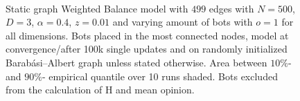 \documentclass[11pt]{article}
\begin{document}
\begin{figure}[!htb]
\begin{center}
\\[-2.3ex]


\end{center}
\caption{Static graph Weighted Balance model with $499$ edges with $N=500$, $D=3$, $\alpha=0.4$, $z=0.01$ and varying amount of bots with $o=1$ for all dimensions. Bots placed in the most connected nodes, model at convergence/after 100k single updates and on randomly initialized Barabási–Albert graph unless stated otherwise. Area between $10\%$- and $90\%$- empirical quantile over 10 runs shaded. Bots excluded from the calculation of H and mean opinion.
}
\end{figure}
\end{document}
